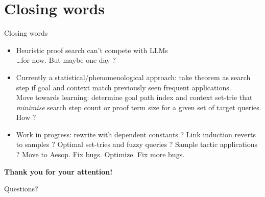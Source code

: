 \documentclass[aspectratio=169]{beamer}
\begin{document}
\section{Closing words}

\begin{frame}{Closing words}

\begin{itemize}
	\item Heuristic proof search can't compete with LLMs \\\dots for now. But maybe one day ?
	\item Currently a \alert{statistical/phenomenological} approach: take theorem as search step if goal and context match previously seen  frequent applications.
	\\Move towards \alert{learning}: determine goal path index and context set-trie that \textit{minimise} search step count or proof term size for a given set of target queries. How ?
	\item Work in progress: rewrite with dependent constants ? Link induction reverts to samples ? Optimal set-tries and fuzzy queries ? Sample tactic applications ? Move to Aesop. Fix bugs. Optimize. Fix more bugs. 

\end{itemize}

\end{frame}

\begin{frame}
  \centering
  \vfill
  {\color{keywordcolor}\Huge\bfseries Thank you for your attention!}\par
  \vspace{1.2em}
  {\large Questions?}
  \vfill
\end{frame}
\end{document}
